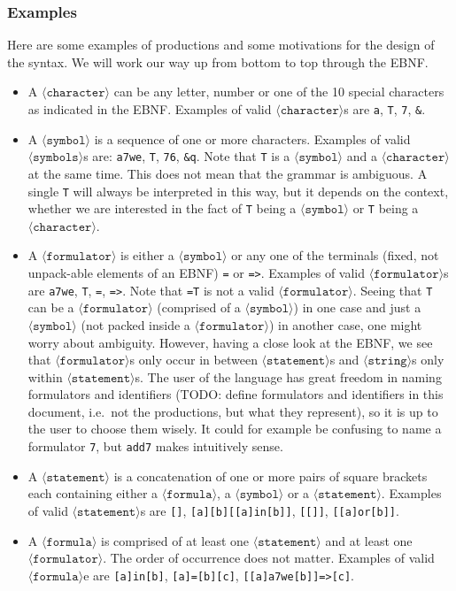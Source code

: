 \documentclass[british]{article}
\newcommand\prv{bc}
\newcommand\m[1]{\texttt{#1}}
\begin{document}
\subsubsection{Examples}

Here are some examples of productions and some motivations for the
design of the syntax. We will work our way up from bottom to top through
the EBNF.
\begin{itemize}
\item A $\langle\texttt{character}\rangle$ can be any letter, number or
one of the 10 special characters as indicated in the EBNF\@. Examples
of valid $\langle\texttt{character}\rangle$s are \m{a}, \m{T},
\m{7}, \m{&}.
\item A $\langle\texttt{symbol}\rangle$ is a sequence of one or more characters.
Examples of valid $\langle\texttt{symbols}\rangle$s are: \m{a7we},
\m{T}, \m{76}, \m{&q}. Note that \m{T} is a $\langle\texttt{symbol}\rangle$
and a $\langle\texttt{character}\rangle$ at the same time. This does
not mean that the grammar is ambiguous. A single \m{T} will always
be interpreted in this way, but it depends on the context, whether
we are interested in the fact of \m{T} being a $\langle\texttt{symbol}\rangle$
or \m{T} being a $\langle\texttt{character}\rangle$.
\item A $\langle\texttt{formulator}\rangle$ is either a $\langle\texttt{symbol}\rangle$
or any one of the terminals (fixed, not \textquotedbl unpack-able\textquotedbl{}
elements of an EBNF) \m{=} or \m{=>}. Examples of valid $\langle\texttt{formulator}\rangle$s
are \m{a7we}, \m{T}, \m{=}, \m{=>}. Note that \m{=T} is not a
valid $\langle\texttt{formulator}\rangle$. Seeing that \m{T} can
be a $\langle\texttt{formulator}\rangle$ (comprised of a $\langle\texttt{symbol}\rangle$)
in one case and just a $\langle\texttt{symbol}\rangle$ (not packed
inside a $\langle\texttt{formulator}\rangle$) in another case, one
might worry about ambiguity. However, having a close look at the EBNF,
we see that $\langle\texttt{formulator}\rangle$s only occur in between
$\langle\texttt{statement}\rangle$s and $\langle\texttt{string}\rangle$s
only within $\langle\texttt{statement}\rangle$s. The user of the
language has great freedom in naming formulators and identifiers (TODO:
define formulators and identifiers in this document, i.e.\ not the
productions, but what they represent), so it is up to the user to
choose them wisely. It could for example be confusing to name a formulator
\m{7}, but \m{add7} makes intuitively sense.
\item A $\langle\texttt{statement}\rangle$ is a concatenation of one or
more pairs of square brackets each containing either a $\langle\texttt{formula}\rangle$,
a $\langle\texttt{symbol}\rangle$ or a $\langle\texttt{statement}\rangle$.
Examples of valid $\langle\texttt{statement}\rangle$s are \m{[]},
\m{[a][b][[a]in[b]]}, \m{[[]]}, \m{[[a]or[b]]}.
\item A $\langle\texttt{formula}\rangle$ is comprised of at least one $\langle\texttt{statement}\rangle$
and at least one $\langle\texttt{formulator}\rangle$. The order of
occurrence does not matter. Examples of valid $\langle\texttt{formula}\rangle$e
are \m{[a]in[b]}, \m{[a]=[b][c]}, \m{[[a]a7we[b]]=>[c]}.
\end{itemize}
\end{document}
